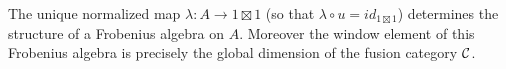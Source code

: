 \documentclass{amsart}
\begin{document}
\begin{proposition} \label{prop:FrobAlg_for_fusion}
	The unique normalized map $\lambda:A \to 1 \boxtimes 1$ (so that $\lambda \circ u = id_{1 \boxtimes 1}$) determines the structure of a Frobenius algebra on $A$. Moreover the window element of this Frobenius algebra is precisely the global dimension of the fusion category $\mathcal C$. 
\end{proposition}





	
\end{document}
